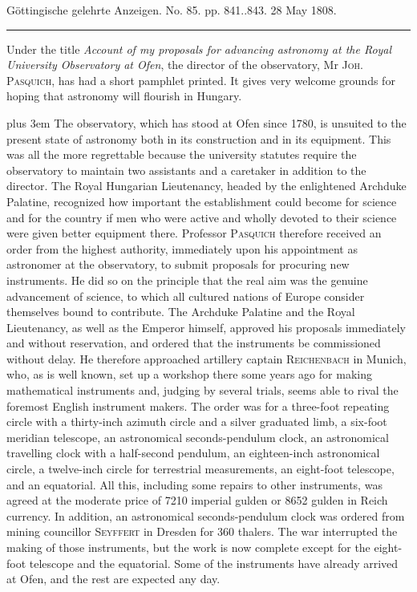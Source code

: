 \clearpage
{}
\hypertarget{native-502-lower}{}\label{native-502-lower}
\begin{center}
\small Göttingische gelehrte Anzeigen. No. 85. pp. 841..843. 28 May 1808.\\[3pt]
\rule{.72\linewidth}{.3pt}
\end{center}

Under the title \emph{Account of my proposals for advancing astronomy at the Royal University Observatory at Ofen}, the director of the observatory, Mr \textsc{Joh. Pasquich}, has had a short pamphlet printed. It gives very welcome grounds for hoping that astronomy will flourish in Hungary.

{\rightskip=0pt plus 3em The observatory, which has stood at Ofen since 1780, is unsuited to the present state of astronomy both in its construction and in its equipment. This was all the more regrettable because the university statutes require the observatory to maintain two assistants and a caretaker in addition to the director. The Royal Hungarian Lieutenancy, headed by the enlightened Archduke Palatine, recognized how important the establishment could become for science and for the country if men who were active and wholly devoted to their science were given better equipment there. Professor \textsc{Pasquich} therefore received an order from the highest authority, immediately upon his appointment as astronomer at the observatory, to submit proposals for procuring new instruments. He did so on the principle that the real aim was the genuine advancement of science, to which all cultured nations of Europe consider themselves bound to contribute. The Archduke Palatine and the Royal Lieutenancy, as well as the Emperor himself, approved his proposals immediately and without reservation, and ordered that the instruments be commissioned without delay. He therefore approached artillery captain \textsc{Reichenbach} in Munich, who, as is well known, set up a workshop there some years ago for making mathematical instruments and, judging by several trials, seems able to rival the foremost English instrument makers. The order was for a three-foot repeating circle with a thirty-inch azimuth circle and a silver graduated limb, a six-foot meridian telescope, an astronomical seconds-pendulum clock, an astronomical travelling clock with a half-second pendulum, an eighteen-inch
astronomical circle, a twelve-inch circle for terrestrial measurements, an eight-foot telescope, and an equatorial. All this, including some repairs to other instruments, was agreed at the moderate price of 7210 imperial gulden or 8652 gulden in Reich currency. In addition, an astronomical seconds-pendulum clock was ordered from mining councillor \textsc{Seyffert} in Dresden for 360 thalers. The war interrupted the making of those instruments, but the work is now complete except for the eight-foot telescope and the equatorial. Some of the instruments have already arrived at Ofen, and the rest are expected any day.\par}

